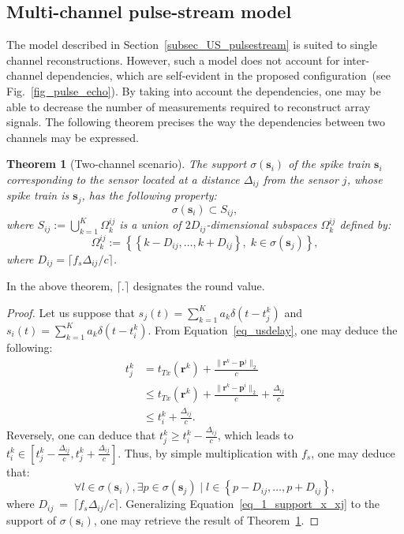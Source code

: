 \documentclass{article}
\newtheorem{theorem}{Theorem}
\newcommand{\vect}[1]{\bm{#1}}
\newcommand{\ser}[2]{#1^{#2}}
\theoremstyle{definition}
\begin{document}
\subsection{Multi-channel pulse-stream model}
\label{subsec_US_multiplechannels}
The model described in Section~\ref{subsec_US_pulsestream} is suited to single channel reconstructions. 
However, such a model does not account for inter-channel dependencies, which are self-evident in the proposed configuration~(see Fig.~\ref{fig_pulse_echo}). 
By taking into account the dependencies, one may be able to decrease the number of measurements required to reconstruct array signals.
The following theorem precises the way the dependencies between two channels may be expressed.
\begin{theorem}[Two-channel scenario]
\label{th_2sens_subspace}
The support $\sigma \left(\vect{s}_i\right)$ of the spike train $\vect{s}_i$ corresponding to the sensor located at a distance $\Delta_{ij}$ from the sensor $j$, whose spike train is $\vect{s}_j$, has the following property:
	\begin{equation*}
		\sigma \left(\vect{s}_i\right) \subset S_{ij},
	\end{equation*}
	where $S_{ij} := \bigcup \limits_{k=1}^K \ser{\Omega_k}{ij}$ is a union of $2 D_{ij}$-dimensional subspaces $\ser{\Omega_k}{ij}$ defined by: 
	\begin{equation*}
		\ser{\Omega_k}{ij} := \left \lbrace \left \lbrace k - D_{ij},\dots, k+ D_{ij} \right\rbrace, \; k \in \sigma \left(\vect{s}_{j}\right) \right\rbrace,
	\end{equation*}
	where $D_{ij}=\lceil f_s \Delta_{ij}/ c  \rceil$. 
\end{theorem}
In the above theorem, $\lceil.\rceil$ designates the round value.
\begin{proof}
	Let us suppose that $s_j \left(t\right) = \sum_{k=1}^{K} a_k \delta \left(t - \ser{t_j}{k}\right)$ and $s_i \left(t\right) = \sum_{k=1}^{K} a_k \delta \left(t - \ser{t_i}{k}\right)$. From Equation~\eqref{eq_usdelay}, one may deduce the following:
	\begin{align*}
	\ser{t_j}{k} &= t_{Tx}\left(\vect{r}^k\right) + \frac{\|\vect{r}^k - \vect{p}^j \|_2}{c}\\
	&\leq  t_{Tx}\left(\vect{r}^k\right) + \frac{\|\vect{r}^k - \vect{p}^i \|_2}{c} + \frac{\Delta_{ij}}{c}\\
	&\leq \ser{t_i}{k} + \frac{\Delta_{ij}}{c}.
	\end{align*}
	Reversely, one can deduce that $\ser{t_j}{k} \geq \ser{t_i}{k} - \frac{\Delta_{ij}}{c}$, which leads to $\ser{t_i}{k} \in \left[\ser{t_j}{k} -\frac{\Delta_{ij}}{c}, \ser{t_j}{k} +\frac{\Delta_{ij}}{c}\right]$. Thus, by simple multiplication with $f_s$, one may deduce that:
	\begin{equation}
	\label{eq_1_support_x_xj}
		\forall l \in \sigma\left(\vect{s}_i\right), \exists p \in \sigma \left(\vect{s}_j\right) \; | \; l \in \left\lbrace p-D_{ij},\dots,p+D_{ij}\right\rbrace,
	\end{equation}
	where $D_{ij}~=~\lceil f_s \Delta_{ij}/ c  \rceil$. Generalizing Equation~\eqref{eq_1_support_x_xj} to the support of $\sigma\left(\vect{s}_i\right)$, one may retrieve the result of Theorem~\ref{th_2sens_subspace}.
\end{proof}
\end{document}
